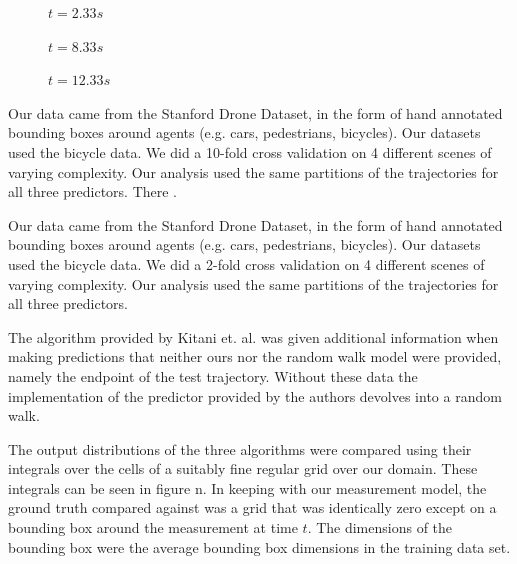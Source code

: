 \documentclass[letterpaper,10pt,conference]{ieeeconf}
\begin{document}
\begin{figure}
	\hspace{.02\linewidth}
	\begin{minipage}{0.3\linewidth}
		\centering
		$t = 2.33s$
	\end{minipage}
	\begin{minipage}{0.3\linewidth}
		\centering
		$t = 8.33s$
	\end{minipage}
	\begin{minipage}{0.3\linewidth}
		\centering
		$t = 12.33s$
	\end{minipage}
	
	\label{fig:death-1-2}
\end{figure}
Our data came from the Stanford Drone Dataset, in the form of hand annotated bounding boxes around agents (e.g. cars, pedestrians, bicycles). 
Our datasets used the bicycle data. 
We did a 10-fold cross validation on 4 different scenes of varying complexity. 
Our analysis used the same partitions of the trajectories for all three predictors. There .%

Our data came from the Stanford Drone Dataset, in the form of hand annotated bounding boxes around agents (e.g. cars, pedestrians, bicycles). Our datasets used the bicycle data. We did a 2-fold cross validation on 4 different scenes of varying complexity. Our analysis used the same partitions of the trajectories for all three predictors.

The algorithm provided by Kitani et. al. was given additional information when making predictions that neither ours nor the random walk model were provided, namely the endpoint of the test trajectory. Without these data the implementation of the predictor provided by the authors devolves into a random walk.

The output distributions of the three algorithms were compared using their integrals over the cells of a suitably fine regular grid over our domain. These integrals can be seen in {figure n}. 
In keeping with our measurement model, the ground truth compared against was a grid that was identically zero except on a bounding box around the measurement at time $t$. The dimensions of the bounding box were the average bounding box dimensions in the training data set. 
\label{fig:auc_vs_time}
\label{fig:total_rocs}
\begin{figure}
\end{figure}
\end{document}
